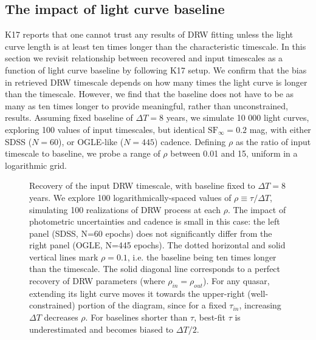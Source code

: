 \documentclass[twocolumn]{aastex62}
\begin{document}
\subsection{The impact of light curve baseline}\label{sec:baseline}

K17 reports that one cannot trust any results of DRW fitting unless the light curve length is at least ten times longer than the characteristic timescale. In this section we revisit relationship between recovered and input timescales as a function of light curve baseline by following K17 setup. We confirm that the bias in retrieved DRW timescale depends on how many times the light curve is longer than the timescale. However, we find that the baseline does not have to be as many as ten times longer to provide meaningful, rather than unconstrained, results. Assuming fixed baseline of $\Delta T = 8$ years, we simulate 10 000 light curves, exploring 100 values of input timescales, but identical $\mathrm{SF}_{\infty}=0.2$ mag, with either SDSS ($N=60$), or OGLE-like ($N=445$) cadence. Defining $\rho$ as the ratio of input timescale to baseline, we probe a range of $\rho$ between 0.01 and 15, uniform in a logarithmic grid.


\begin{figure*}  %
	\caption{Recovery of the input DRW timescale, with baseline fixed to $\Delta T = 8$ years. We explore 100 logarithmically-spaced values of $\rho \equiv \tau / \Delta T$, simulating 100 realizations of DRW process at each $\rho$. The impact of photometric uncertainties and cadence is small in this case: the left panel (SDSS, N=60 epochs) does not significantly differ from the right panel (OGLE, N=445 epochs). The dotted horizontal and solid vertical lines mark $\rho = 0.1$, i.e. the baseline being ten times longer than the timescale. The solid diagonal line corresponds to a perfect recovery of DRW parameters (where $\rho_{in} =\rho_{out} $). For any quasar, extending its light curve  moves it towards the upper-right (well-constrained) portion of the diagram, since for a fixed $\tau_{in}$, increasing $\Delta T$ decreases $\rho$. For baselines shorter than $\tau$, best-fit $\tau$ is underestimated and becomes biased to $\Delta T /2 $. } 
	\label{fig:rho_space}
\end{figure*}
\end{document}
